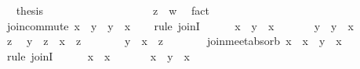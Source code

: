 \begin{isabellebody}
\ \isamarkupfalse%
\ {\isacharquery}thesis\ \isacommand{{\isachardot}}\isamarkupfalse%
\isanewline
\ \ \ \ \ \ \ \ \isamarkupfalse%
\isanewline
\ \ \ \ \ \ \ \ \isamarkupfalse%
\ {\isachardoublequoteopen}z\ {\isasymsqsubseteq}\ w{\isachardoublequoteclose}\ \isamarkupfalse%
\ fact\isanewline
\ \ \ \ \ \ \isamarkupfalse%
\isanewline
\ \ \ \ \isamarkupfalse%
\isanewline
\ \ \isamarkupfalse%
\isanewline
\isanewline
\ \ \isamarkupfalse%
\ join{\isacharunderscore}commute{\isacharcolon}\ {\isachardoublequoteopen}x\ {\isasymsqunion}\ y\ {\isacharequal}\ y\ {\isasymsqunion}\ x{\isachardoublequoteclose}\isanewline
\ \ \isamarkupfalse%
\ {\isacharparenleft}rule\ joinI{\isacharparenright}\isanewline
\ \ \ \ \isamarkupfalse%
\ {\isachardoublequoteopen}x\ {\isasymsqsubseteq}\ y\ {\isasymsqunion}\ x{\isachardoublequoteclose}\ \isacommand{{\isachardot}{\isachardot}}\isamarkupfalse%
\isanewline
\ \ \ \ \isamarkupfalse%
\ {\isachardoublequoteopen}y\ {\isasymsqsubseteq}\ y\ {\isasymsqunion}\ x{\isachardoublequoteclose}\ \isacommand{{\isachardot}{\isachardot}}\isamarkupfalse%
\isanewline
\ \ \ \ \isamarkupfalse%
\ z\ \isamarkupfalse%
\ {\isachardoublequoteopen}y\ {\isasymsqsubseteq}\ z{\isachardoublequoteclose}\ \ {\isachardoublequoteopen}x\ {\isasymsqsubseteq}\ z{\isachardoublequoteclose}\isanewline
\ \ \ \ \isamarkupfalse%
\ \isamarkupfalse%
\ {\isachardoublequoteopen}y\ {\isasymsqunion}\ x\ {\isasymsqsubseteq}\ z{\isachardoublequoteclose}\ \isacommand{{\isachardot}{\isachardot}}\isamarkupfalse%
\isanewline
\ \ \isamarkupfalse%
\isanewline
\isanewline
\ \ \isamarkupfalse%
\ join{\isacharunderscore}meet{\isacharunderscore}absorb{\isacharcolon}\ {\isachardoublequoteopen}x\ {\isasymsqunion}\ {\isacharparenleft}x\ {\isasymsqinter}\ y{\isacharparenright}\ {\isacharequal}\ x{\isachardoublequoteclose}\isanewline
\ \ \isamarkupfalse%
\ {\isacharparenleft}rule\ joinI{\isacharparenright}\isanewline
\ \ \ \ \isamarkupfalse%
\ {\isachardoublequoteopen}x\ {\isasymsqsubseteq}\ x{\isachardoublequoteclose}\ \isacommand{{\isachardot}{\isachardot}}\isamarkupfalse%
\isanewline
\ \ \ \ \isamarkupfalse%
\ {\isachardoublequoteopen}x\ {\isasymsqinter}\ y\ {\isasymsqsubseteq}\ x{\isachardoublequoteclose}\ \isacommand{{\isachardot}{\isachardot}}\isamarkupfalse%

\end{isabellebody}
